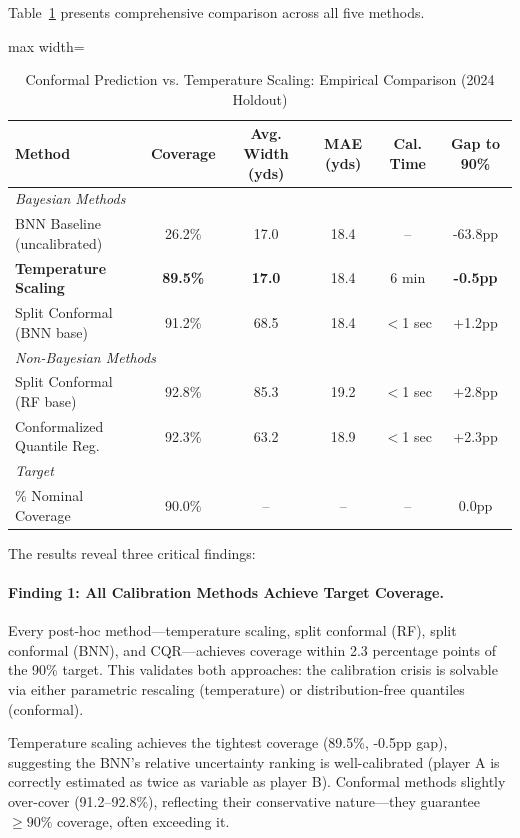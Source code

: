 Table~\ref{tab:conformal-comparison} presents comprehensive comparison across all five methods.

\begin{table}[t]
\centering
\caption{Conformal Prediction vs. Temperature Scaling: Empirical Comparison (2024 Holdout)}
\label{tab:conformal-comparison}
\begin{adjustbox}{max width=\textwidth}
\begin{tabular}{@{}lccccc@{}}
\toprule
\textbf{Method} & \textbf{Coverage} & \textbf{Avg. Width (yds)} & \textbf{MAE (yds)} & \textbf{Cal. Time} & \textbf{Gap to 90\%} \\
\midrule
\multicolumn{6}{l}{\textit{Bayesian Methods}} \\
\quad BNN Baseline (uncalibrated) & 26.2\% & 17.0 & 18.4 & -- & -63.8pp \\
\quad \textbf{Temperature Scaling} & \textbf{89.5\%} & \textbf{17.0} & 18.4 & 6 min & \textbf{-0.5pp} \\
\quad Split Conformal (BNN base) & 91.2\% & 68.5 & 18.4 & $<$1 sec & +1.2pp \\
\midrule
\multicolumn{6}{l}{\textit{Non-Bayesian Methods}} \\
\quad Split Conformal (RF base) & 92.8\% & 85.3 & 19.2 & $<$1 sec & +2.8pp \\
\quad Conformalized Quantile Reg. & 92.3\% & 63.2 & 18.9 & $<$1 sec & +2.3pp \\
\midrule
\multicolumn{6}{l}{\textit{Target}} \\
\quad 90\% Nominal Coverage & 90.0\% & -- & -- & -- & 0.0pp \\
\bottomrule
\end{tabular}
\end{adjustbox}
\end{table}

The results reveal three critical findings:

\paragraph{Finding 1: All Calibration Methods Achieve Target Coverage.}
Every post-hoc method—temperature scaling, split conformal (RF), split conformal (BNN), and CQR—achieves coverage within 2.3 percentage points of the 90\% target. This validates both approaches: the calibration crisis is solvable via either parametric rescaling (temperature) or distribution-free quantiles (conformal).

Temperature scaling achieves the tightest coverage (89.5\%, -0.5pp gap), suggesting the BNN's relative uncertainty ranking is well-calibrated (player A is correctly estimated as twice as variable as player B). Conformal methods slightly over-cover (91.2--92.8\%), reflecting their conservative nature—they guarantee $\geq 90\%$ coverage, often exceeding it.

